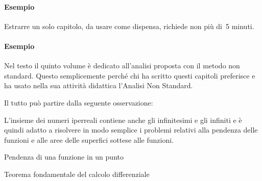 \documentclass[a4paper,10pt]{article}
\begin{document}
\paragraph{Esempio} Estrarre un solo capitolo, da usare come dispensa, 
richiede non più di~5 minuti.

\paragraph{Esempio} Nel testo il quinto volume è dedicato all'analisi 
proposta con il metodo non standard.
Questo semplicemente perché chi ha scritto questi capitoli preferisce e ha 
usato nella sua attività didattica l'Analisi Non Standard.

Il tutto può partire dalla seguente osservazione:

\vspace{1em}

\bigskip
L'insieme dei numeri iperreali contiene anche gli infinitesimi e gli 
infiniti e è quindi adatto a risolvere in modo semplice i problemi relativi 
alla pendenza delle funzioni e alle aree delle superfici sottese alle 
funzioni.

\begin{center}
Pendenza di una funzione in un punto

\end{center}

\pagebreak
\begin{center}
Teorema fondamentale del calcolo differenziale

\end{center}
\end{document}
